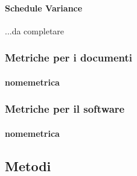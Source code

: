 			\paragraph{Schedule Variance}		
			...da completare	
		\subsubsection{Metriche per i documenti}
		
			\paragraph{nomemetrica}
			
		\subsubsection{Metriche per il software}
			\paragraph{nomemetrica}
	\subsection{Metodi}


